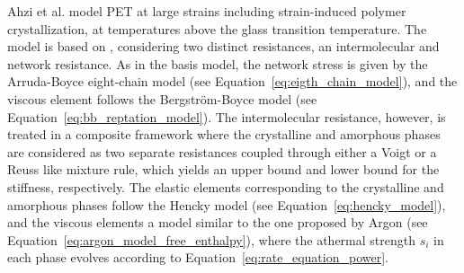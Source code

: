 
Ahzi et al. \citep{ahziModelingDeformationBehavior2003} model PET at large strains including strain-induced polymer crystallization, at temperatures above the glass transition temperature.
The model is based on \citep{boyceConstitutiveModelFinite2000}, considering two distinct resistances, an intermolecular and network resistance.
As in the basis model, the network stress is given by the Arruda-Boyce eight-chain model (see Equation~\eqref{eq:eigth_chain_model}), and the viscous element follows the Bergström-Boyce model (see Equation~\eqref{eq:bb_reptation_model}).
The intermolecular resistance, however, is treated in a composite framework where the crystalline and amorphous phases are considered as two separate resistances coupled through either a Voigt or a Reuss like mixture rule, which yields an upper bound and lower bound for the stiffness, respectively.
The elastic elements corresponding to the crystalline and amorphous phases follow the Hencky model (see Equation~\eqref{eq:hencky_model}), and the viscous elements a model similar to the one proposed by Argon (see Equation~\eqref{eq:argon_model_free_enthalpy}), where the athermal strength $s_i$ in each phase evolves according to Equation~\eqref{eq:rate_equation_power}.

